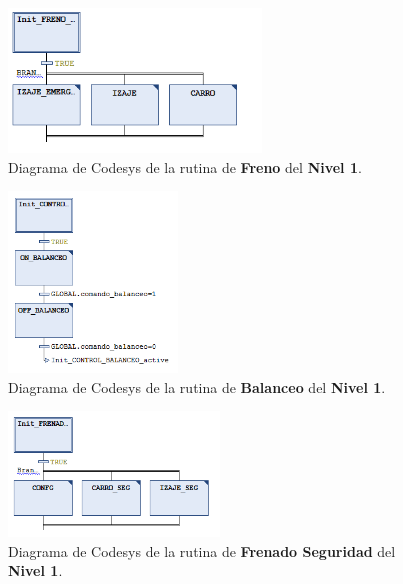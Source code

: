 \documentclass[11pt]{article}
\begin{document}
\begin{figure}
	\centering
	\includegraphics[width=0.6\textwidth]{images/codesys_nivel_1_freno.png}
	\caption{Diagrama de Codesys de la rutina de \textbf{Freno} del \textbf{Nivel 1}.}
	\label{fig:codesys_nivel_1_freno}
\end{figure}

\begin{figure}
	\centering
	\includegraphics[width=0.4\textwidth]{images/codesys_nivel_1_balanceo.png}
	\caption{Diagrama de Codesys de la rutina de \textbf{Balanceo} del \textbf{Nivel 1}.}
	\label{fig:codesys_nivel_1_balanceo}
\end{figure}

\begin{figure}
	\centering
	\includegraphics[width=0.5\textwidth]{images/codesys_nivel_1_frenado_seguridad.png}
	\caption{Diagrama de Codesys de la rutina de \textbf{Frenado Seguridad} del \textbf{Nivel 1}.}
	\label{fig:codesys_nivel_1_frenado_seguridad}
\end{figure}

\newpage
\end{document}
